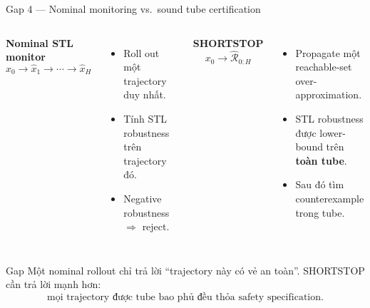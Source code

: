 \documentclass[aspectratio=169]{beamer}
\begin{document}
\begin{frame}[t,shrink=8]{Gap 4 --- Nominal monitoring vs.\ sound tube certification}
\begin{columns}[T]

\textbf{Nominal STL monitor}
\[
x_0
\rightarrow
\hat x_1
\rightarrow
\cdots
\rightarrow
\hat x_H
\]
\begin{itemize}
    \item Roll out một trajectory duy nhất.
    \item Tính STL robustness trên trajectory đó.
    \item Negative robustness $\Rightarrow$ reject.
\end{itemize}

\textbf{SHORTSTOP}
\[
x_0
\rightarrow
\boxed{
\hat{\mathcal R}_{0:H}
}
\]
\begin{itemize}
    \item Propagate một reachable-set over-approximation.
    \item STL robustness được lower-bound trên \textbf{toàn tube}.
    \item Sau đó tìm counterexample trong tube.
\end{itemize}

\end{columns}
\vspace{6pt}

\begin{alertblock}{Gap}
Một nominal rollout chỉ trả lời ``trajectory này có vẻ an toàn''.
SHORTSTOP cần trả lời mạnh hơn:
\[
\boxed{\text{mọi trajectory được tube bao phủ đều thỏa safety specification.}}
\]
\end{alertblock}
\end{frame}

\end{document}
